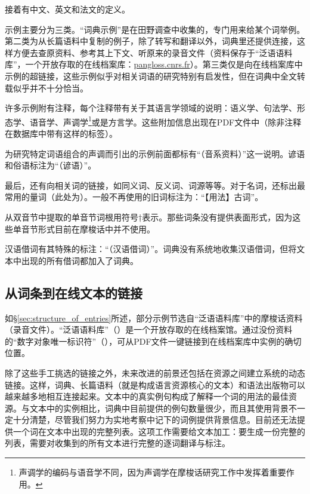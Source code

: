 接着有中文、英文和法文的定义。

示例主要分为三类。“词典示例”是在田野调查中收集的，专门用来给某个词举例。第二类为从长篇语料中复制的例子，除了转写和翻译以外，词典里还提供连接，这样方便去查原资料、参考其上下文、听原来的录音文件（资料保存于“泛语语料库”，一个开放存取的在线档案库：\href{https://pangloss.cnrs.fr/}{pangloss.cnrs.fr}）。第三类仅是向在线档案库中示例的超链接，这些示例似乎对相关词语的研究特别有启发性，但在词典中全文转载似乎并不十分恰当。

许多示例附有注释，每个注释带有关于其语言学领域的说明：语义学、句法学、形态学、语音学、声调学\footnote{声调学的编码与语音学不同，因为声调学在摩梭话研究工作中发挥着重要作用。}或是方言学。这些附加信息出现在PDF文件中（除非注释在数据库中带有这样的标签）。

为研究特定词语组合的声调而引出的示例前面都标有“（音系资料）”这一说明。谚语和俗语标注为“（谚语）”。

最后，还有向相关词的链接，如同义词、反义词、词源等等。对于名词，还标出最常用的量词（此处为）。一般不再使用的旧词标注为：“【用法】古词”。

从双音节中提取的单音节词根用符号†表示。那些词条没有提供表面形式，因为这些单音节形式目前在摩梭话中并不使用。

汉语借词有其特殊的标注：“（汉语借词）”。词典没有系统地收集汉语借词，但将文本中出现的所有借词都加入了词典。

\subsection{从词条到在线文本的链接}

如§\ref{sec:structure_of_entries}所述，部分示例节选自“泛语语料库”中的摩梭话资料（录音文件）。“泛语语料库”（）是一个开放存取的在线档案馆\parencite[参见][]{michailovskyetal2014}。通过没份资料的“数字对象唯一标识符”（），可从PDF文件一键链接到在线档案库中实例的确切位置。

除了这些手工挑选的链接之外，未来改进的前景还包括在资源之间建立系统的动态链接。这样，词典、长篇语料（就是构成语言资源核心的文本）和语法出版物可以越来越多地相互连接起来\parencite{maxwell2012}。文本中的真实例句构成了解释一个词的用法的最佳资源。与文本中的实例相比，词典中目前提供的例句数量很少，而且其使用背景不一定十分清楚，尽管我们努力为实地考察中记下的词例提供背景信息。目前还无法提供一个词在文本中出现的完整列表。这项工作需要给文本加工：要生成一份完整的列表，需要对收集到的所有文本进行完整的逐词翻译与标注。


